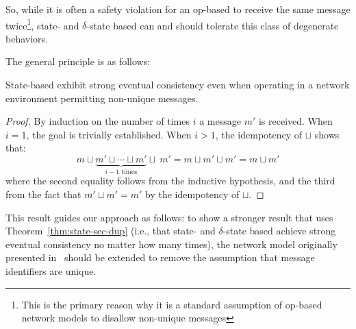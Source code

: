 So, while it is often a safety violation for an op-based \CRDT to receive the
same message twice\footnote{This is the primary reason why it is a standard
assumption of op-based network models to disallow non-unique messages},
state- and $\delta$-state based \CRDTs can and should tolerate this class of
degenerate behaviors.

The general principle is as follows:
\begin{theorem} \label{thm:state-sec-dup}
  State-based \CRDTs exhibit strong eventual consistency even when operating in
  a network environment permitting non-unique messages.
\end{theorem}
\begin{proof}
  By induction on the number of times $i$ a message $m'$ is received. When $i =
  1$, the goal is trivially established. When $i > 1$, the idempotency of
  $\sqcup$ shows that:
  \[
    m \sqcup \underbrace{m' \sqcup \cdots \sqcup m'}_{\text{$i-1$ times}} \sqcup~m'
      = m \sqcup m' \sqcup m'
      = m \sqcup m'
  \]
  where the second equality follows from the inductive hypothesis, and the third
  from the fact that $m' \sqcup m' = m'$ by the idempotency of $\sqcup$.
\end{proof}

This result guides our approach as follows: to show a stronger result that uses
Theorem~\ref{thm:state-sec-dup} (i.e., that state- and $\delta$-state based
\CRDTs achieve strong eventual consistency no matter how many times), the network
model originally presented in~\citep{gomes17} should be extended to remove the
assumption that message identifiers are unique.

